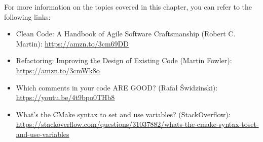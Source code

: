 For more information on the topics covered in this chapter, you can refer to the following links:

\begin{itemize}
\item
Clean Code: A Handbook of Agile Software Craftsmanship (Robert C. Martin): \url{https://amzn.to/3cm69DD}

\item
Refactoring: Improving the Design of Existing Code (Martin Fowler): \url{https://amzn.to/3cmWk8o}

\item
Which comments in your code ARE GOOD? (Rafał Świdzinski): \url{https://youtu.be/4t9bpo0THb8}

\item
What’s the CMake syntax to set and use variables? (StackOverflow): \url{https://stackoverflow.com/questions/31037882/whats-the-cmake-syntax-toset-and-use-variables}
\end{itemize}





















